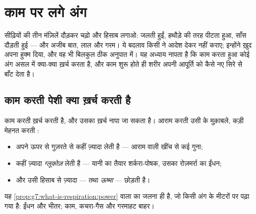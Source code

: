 \chapter{काम पर लगे अंग}\label{ch:g7:organs-at-work}

सीढ़ियों की तीन मंज़िलें दौड़कर चढ़ो और हिसाब लगाओ:  जलती हुईं,
 हथौड़े की तरह पीटता हुआ, साँस दौड़ती हुई --- और अजीब बात,  लाल
और गरम। ये बदलाव किसी ने आदेश देकर नहीं कराए; इन्होंने ख़ुद अपना हुक्म
दिया, और वह भी बिलकुल ठीक अनुपात में। यह अध्याय नापता है कि काम करता
हुआ कोई अंग असल में क्या-क्या ख़र्च करता है, और काम शुरू होते ही शरीर
अपनी आपूर्ति को कैसे नए सिरे से बाँट देता है।

\section{काम करती पेशी क्या ख़र्च करती है}

\begin{proposition}[पेशी का बिल]\label{prop:g7:organs-at-work:bill}
काम करती  ख़र्च करती है, और उसका ख़र्च नापा जा सकता है। आराम करती
उसी  के मुक़ाबले, कड़ी मेहनत करती :
\begin{itemize}
  \item अपने ऊपर से गुज़रते  से कहीं ज़्यादा \emph{} लेती है
        --- आराम वाली खींच से कई गुना;
  \item कहीं ज़्यादा \emph{ग्लूकोज़} लेती है --- यानी
         का तैयार शर्करा-पोषक, उसका रोज़मर्रा का ईंधन;
  \item और उसी हिसाब से ज़्यादा \emph{} --- तथा
        \emph{ऊष्मा} --- छोड़ती है।
\end{itemize}
यह \cref{prop:g7:what-is-respiration:power} वाला  का जलना ही
है, जो किसी अंग के मीटरों पर पढ़ा गया है: ईंधन और  भीतर; काम,
कचरा-गैस और गरमाहट बाहर।
\end{proposition}
\admitted

